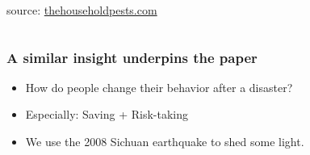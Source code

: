 \documentclass[aspectratio=169]{beamer}
\begin{document}
\begin{frame}[label=top]
\begin{columns}
\begin{column}{0.5\textwidth}
\begin{center}
            {\tiny source: \href{https://thehouseholdpests.org/cicada-life-cycle-images.html}{thehouseholdpests.com}}
        \end{center}
    \end{column}
    \end{columns}
\end{frame}  


\begin{frame}[label=top]
    \frametitle{\Large{A similar insight underpins the paper}}
    \begin{itemize}
		\item How do people change their behavior after a disaster?  
		\item Especially: Saving + Risk-taking
		\item We use the 2008 Sichuan earthquake to shed some light. 
	\end{itemize}
\end{frame}  
\end{document}
